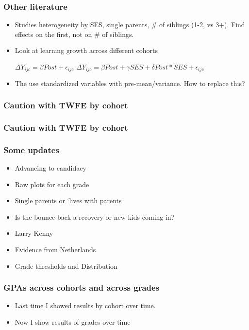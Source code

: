 \documentclass{beamer}
\begin{document}
\begin{frame}
    \label{event_cohort_m}
    \frametitle{Other literature}
    \begin{itemize}
        \item Studies heterogeneity by SES, single parents, # of siblings (1-2, vs 3+). Find effects on the first, not on # of siblings.
        \item Look at learning growth across different cohorts
   
       $\Delta Y_{ijc}= \beta Post + \epsilon_{ijc}$ 
       $\Delta Y_{ijc}= \beta Post + \gamma SES + \delta Post*SES + \epsilon_{ijc}$ 
       \item The use standardized variables with pre-mean/variance. How to replace this?
     \end{itemize}
\end{frame}

\begin{frame}
    \label{event_cohort_m}
    \frametitle{Caution with TWFE by cohort}
        {
  }  
\end{frame}


\begin{frame}
    \label{event_cohort_m}
    \frametitle{Caution with TWFE by cohort}
        {
  }  
\end{frame}

\begin{frame}
    \label{update_scott}
    \frametitle{Some updates}
    \begin{itemize}
        \item Advancing to candidacy
        \item Raw plots for each grade
        \item Single parents or `lives with parents
        \item Is the bounce back a recovery or new kids coming in?
        \item Larry Kenny
        \item Evidence from Netherlands
        \item Grade thresholds and Distribution
    \end{itemize}
\end{frame}


\begin{frame}
    \label{update_scott}
    \frametitle{GPAs across cohorts and across grades}
    \begin{itemize}
        \item Last time I showed results by cohort over time.
        \item Now I show results of grades over time
    \end{itemize}
\end{frame}
\end{document}
